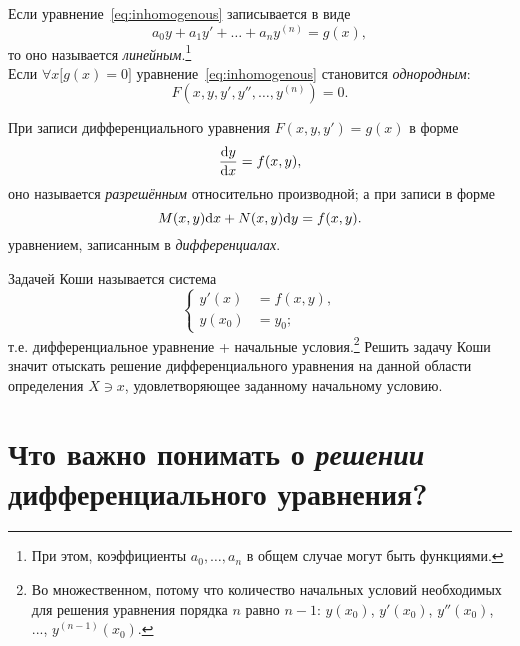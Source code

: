 \documentclass[12pt]{report}
\begin{document}
Если уравнение~\eqref{eq:inhomogenous} записывается в виде
\begin{equation}\label{eq:inhomogenous:linear}
a_0y + a_1y' + \dots + a_ny^{(n)} = g(x),
\end{equation}
то оно называется \emph{линейным}.\footnote{При этом, коэффициенты $a_0, \dots, a_n$ в общем случае могут быть функциями.}\\ 

Если $\forall x \Big[g(x)= 0\Big]$ уравнение~\eqref{eq:inhomogenous} становится \emph{однородным}:
\begin{equation}\label{eq:homogenous}
F\left(x,y,y',y'',\dots, y^{(n)}\right) = 0.
\end{equation}

\begin{rmk}
	При записи дифференциального уравнения $F(x,y,y') = g(x)$ в форме
	\begin{equation*}
	\frac{\mathrm d y}{\mathrm d x} = f(x,y),
	\end{equation*}
	оно называется \emph{разрешённым} относительно производной; а при записи в форме
	\begin{equation}\label{eq:differential-form}
	M(x,y)\mathrm d x + N(x,y)\mathrm d y = f(x,y).
	\end{equation}
	уравнением, записанным в \emph{дифференциалах}.
\end{rmk}

\begin{defn}
	Задачей Коши называется система
	\begin{equation}\label{eq:Cauchy}
		\begin{cases}
		y'(x) &= f(x,y), \\
		y(x_0) &= y_0;
		\end{cases}
	\end{equation}
	т.е. дифференциальное уравнение + начальные условия.\footnote{Во множественном, потому что количество начальных условий необходимых для решения уравнения порядка $n$ равно $n-1$: $y(x_0)$, $y'(x_0)$, $y''(x_0)$, ..., $y^{(n-1)}(x_0)$.} Решить задачу Коши значит отыскать решение дифференциального уравнения на данной области определения $X\ni x$, удовлетворяющее заданному начальному условию.
\end{defn}

\section{Что важно понимать о \emph{решении} дифференциального уравнения?}
\end{document}
